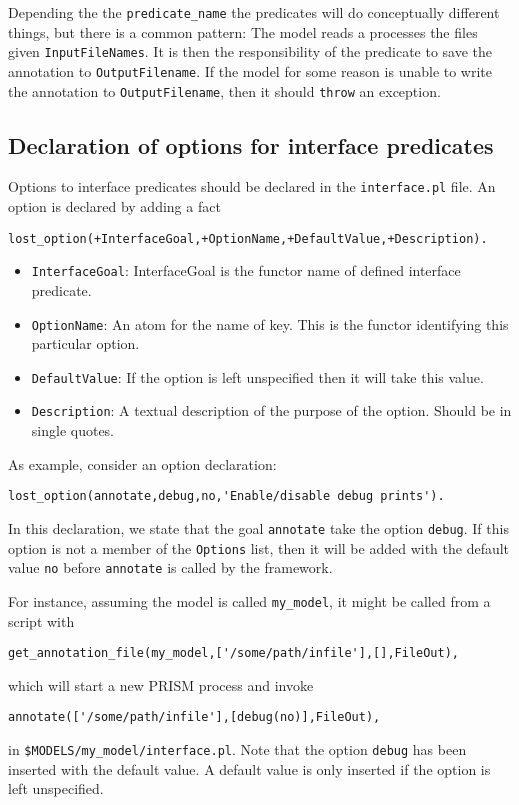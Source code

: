 \documentclass{book}
\begin{document}
Depending the the \texttt{predicate\_name} the predicates will do
conceptually different things, but there is a common pattern:
The model reads a processes the files given \texttt{InputFileNames}.
It is then the responsibility of the predicate to save the
annotation to \texttt{OutputFilename}. If the model for some
reason is unable to write the annotation to \texttt{OutputFilename},
then it should \texttt{throw} an exception.

\subsection{Declaration of options for interface predicates}
\label{sec:optiondeclarations}

Options to interface predicates should be declared in the
\texttt{interface.pl} file. An option is declared by adding a 
fact 
\begin{verbatim}
lost_option(+InterfaceGoal,+OptionName,+DefaultValue,+Description).
\end{verbatim}

\begin{itemize}
\item \texttt{InterfaceGoal}: InterfaceGoal is the functor name of defined interface predicate.
\item \texttt{OptionName}: An atom for the name of key. This is the
  functor identifying this particular option.
\item \texttt{DefaultValue}: If the option is left unspecified then
it will take this value.
\item \texttt{Description}: A textual description of the purpose of 
the option. Should be in single quotes. 
\end{itemize}

\noindent
As example, consider an option declaration:
\begin{verbatim}
lost_option(annotate,debug,no,'Enable/disable debug prints').
\end{verbatim}

In this declaration, we state that the goal
\texttt{annotate} take the option
\texttt{debug}. If this option is not a member of the
\texttt{Options} list, then it will be added with the default value \texttt{no} before 
\texttt{annotate} is called by the framework. 

For instance, assuming the model is called \texttt{my\_model}, it
might be called from a script with
\begin{verbatim}
get_annotation_file(my_model,['/some/path/infile'],[],FileOut),
\end{verbatim}
which will start a new PRISM process and invoke 
\begin{verbatim}
annotate(['/some/path/infile'],[debug(no)],FileOut),
\end{verbatim}
in \texttt{\$MODELS/my\_model/interface.pl}.
Note that the option \texttt{debug} has been inserted with the
default value. A default value is only inserted if the option is left
unspecified.
\end{document}

